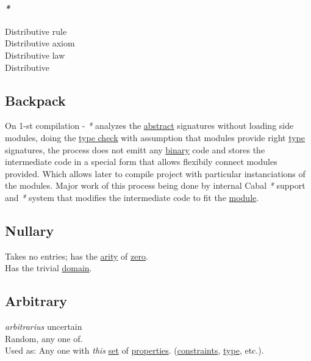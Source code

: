 \documentclass[11pt]{article}
\begin{document}
\paragraph{\emph{*}}
\label{sec:org24eb8cc}

\label{org6c1f376}Distributive rule\\
\label{orge3d34b1}Distributive axiom\\
\label{orgacf9301}Distributive law\\
\label{org755ce9a}Distributive\\

\subsection{\label{org71cfc0c}Backpack}
\label{sec:org1ff9a8b}
On 1-st compilation - \emph{*} analyzes the \hyperref[orgbbe9132]{abstract} signatures without loading side modules, doing the \hyperref[orgf9abc5e]{type check} with assumption that modules provide right \hyperref[orgc4aea2f]{type} signatures, the process does not emitt any \hyperref[org57bd48f]{binary} code and stores the intermediate code in a special form that allows flexibily connect modules provided. Which allows later to compile project with particular instanciations of the modules. Major work of this process being done by internal Cabal \emph{*} support and \emph{*} system that modifies the intermediate code to fit the \hyperref[org5699463]{module}.\\

\subsection{\label{org2fb9b13}Nullary}
\label{sec:org605000a}
Takes no entries; has the \hyperref[orgde25f82]{arity} of \hyperref[org5d1963a]{zero}.\\
Has the trivial \hyperref[org494b48a]{domain}.\\

\subsection{\label{orga23d095}Arbitrary}
\label{sec:orgc658e96}
\emph{arbitrarius} uncertain\\

Random, any one of.\\

Used as: Any one with \emph{this} \hyperref[org1faf06d]{set} of \hyperref[org85fb3a1]{properties}. (\hyperref[orgcddf7a9]{constraints}, \hyperref[orgc4aea2f]{type}, etc.).\\
\end{document}
